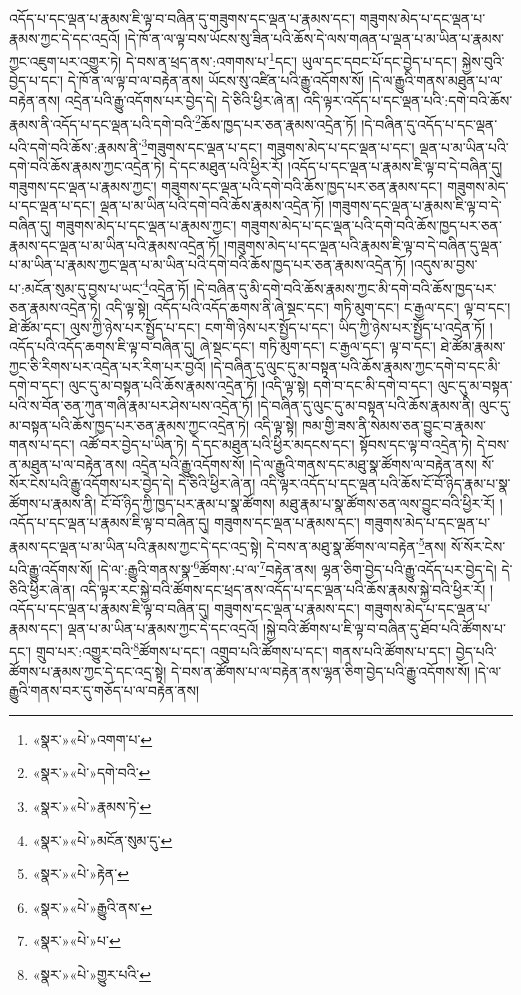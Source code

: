 འདོད་པ་དང་ལྡན་པ་རྣམས་ཇི་ལྟ་བ་བཞིན་དུ་གཟུགས་དང་ལྡན་པ་རྣམས་དང་། གཟུགས་མེད་པ་དང་ལྡན་པ་རྣམས་ཀྱང་དེ་དང་འདྲའོ། །དེ་ཁོ་ན་ལ་ལྟ་བས་ཡོངས་སུ་ཟིན་པའི་ཆོས་དེ་ལས་གཞན་པ་ལྡན་པ་མ་ཡིན་པ་རྣམས་ཀྱང་འཇུག་པར་འགྱུར་ཏེ། དེ་བས་ན་ཕྲད་ནས་:འགགས་པ་\footnote{«སྣར་»«པེ་»འགག་པ་}དང་། ཡུལ་དང་དབང་པོ་དང་བྱེད་པ་དང་། སྐྱེས་བུའི་བྱེད་པ་དང་། དེ་ཁོ་ན་ལ་ལྟ་བ་ལ་བརྟེན་ནས། ཡོངས་སུ་འཛིན་པའི་རྒྱུ་འདོགས་སོ། །དེ་ལ་རྒྱུའི་གནས་མཐུན་པ་ལ་བརྟེན་ནས། འདྲེན་པའི་རྒྱུ་འདོགས་པར་བྱེད་དེ། དེ་ཅིའི་ཕྱིར་ཞེ་ན། འདི་ལྟར་འདོད་པ་དང་ལྡན་པའི་:དགེ་བའི་ཆོས་རྣམས་ནི་འདོད་པ་དང་ལྡན་པའི་དགེ་བའི་\footnote{«སྣར་»«པེ་»དགེ་བའི་}ཆོས་ཁྱད་པར་ཅན་རྣམས་འདྲེན་ཏོ། །དེ་བཞིན་དུ་འདོད་པ་དང་ལྡན་པའི་དགེ་བའི་ཆོས་:རྣམས་ནི་\footnote{«སྣར་»«པེ་»རྣམས་ཏེ་}གཟུགས་དང་ལྡན་པ་དང་། གཟུགས་མེད་པ་དང་ལྡན་པ་དང་། ལྡན་པ་མ་ཡིན་པའི་དགེ་བའི་ཆོས་རྣམས་ཀྱང་འདྲེན་ཏེ། དེ་དང་མཐུན་པའི་ཕྱིར་རོ། །འདོད་པ་དང་ལྡན་པ་རྣམས་ཇི་ལྟ་བ་དེ་བཞིན་དུ། གཟུགས་དང་ལྡན་པ་རྣམས་ཀྱང་། གཟུགས་དང་ལྡན་པའི་དགེ་བའི་ཆོས་ཁྱད་པར་ཅན་རྣམས་དང་། གཟུགས་མེད་པ་དང་ལྡན་པ་དང་། ལྡན་པ་མ་ཡིན་པའི་དགེ་བའི་ཆོས་རྣམས་འདྲེན་ཏོ། །གཟུགས་དང་ལྡན་པ་རྣམས་ཇི་ལྟ་བ་དེ་བཞིན་དུ། གཟུགས་མེད་པ་དང་ལྡན་པ་རྣམས་ཀྱང་། གཟུགས་མེད་པ་དང་ལྡན་པའི་དགེ་བའི་ཆོས་ཁྱད་པར་ཅན་རྣམས་དང་ལྡན་པ་མ་ཡིན་པའི་རྣམས་འདྲེན་ཏོ། །གཟུགས་མེད་པ་དང་ལྡན་པའི་རྣམས་ཇི་ལྟ་བ་དེ་བཞིན་དུ་ལྡན་པ་མ་ཡིན་པ་རྣམས་ཀྱང་ལྡན་པ་མ་ཡིན་པའི་དགེ་བའི་ཆོས་ཁྱད་པར་ཅན་རྣམས་འདྲེན་ཏོ། །འདུས་མ་བྱས་པ་:མངོན་སུམ་དུ་བྱས་པ་ཡང་\footnote{«སྣར་»«པེ་»མངོན་སུམ་དུ་}འདྲེན་ཏོ། །དེ་བཞིན་དུ་མི་དགེ་བའི་ཆོས་རྣམས་ཀྱང་མི་དགེ་བའི་ཆོས་ཁྱད་པར་ཅན་རྣམས་འདྲེན་ཏེ། འདི་ལྟ་སྟེ། འདོད་པའི་འདོད་ཆགས་ནི་ཞེ་སྡང་དང་། གཏི་མུག་དང་། ང་རྒྱལ་དང་། ལྟ་བ་དང་། ཐེ་ཚོམ་དང་། ལུས་ཀྱི་ཉེས་པར་སྤྱོད་པ་དང་། ངག་གི་ཉེས་པར་སྤྱོད་པ་དང་། ཡིད་ཀྱི་ཉེས་པར་སྤྱོད་པ་འདྲེན་ཏོ། །འདོད་པའི་འདོད་ཆགས་ཇི་ལྟ་བ་བཞིན་དུ། ཞེ་སྡང་དང་། གཏི་མུག་དང་། ང་རྒྱལ་དང་། ལྟ་བ་དང་། ཐེ་ཚོམ་རྣམས་ཀྱང་ཅི་རིགས་པར་འདྲེན་པར་རིག་པར་བྱའོ། །དེ་བཞིན་དུ་ལུང་དུ་མ་བསྟན་པའི་ཆོས་རྣམས་ཀྱང་དགེ་བ་དང་མི་དགེ་བ་དང་། ལུང་དུ་མ་བསྟན་པའི་ཆོས་རྣམས་འདྲེན་ཏོ། །འདི་ལྟ་སྟེ། དགེ་བ་དང་མི་དགེ་བ་དང་། ལུང་དུ་མ་བསྟན་པའི་ས་བོན་ཅན་ཀུན་གཞི་རྣམ་པར་ཤེས་པས་འདྲེན་ཏོ། །དེ་བཞིན་དུ་ལུང་དུ་མ་བསྟན་པའི་ཆོས་རྣམས་ནི། ལུང་དུ་མ་བསྟན་པའི་ཆོས་ཁྱད་པར་ཅན་རྣམས་ཀྱང་འདྲེན་ཏེ། འདི་ལྟ་སྟེ། ཁམ་གྱི་ཟས་ནི་སེམས་ཅན་བྱུང་བ་རྣམས་གནས་པ་དང་། འཚོ་བར་བྱེད་པ་ཡིན་ཏེ། དེ་དང་མཐུན་པའི་ཕྱིར་མདངས་དང་། སྟོབས་དང་ལྟ་བ་འདྲེན་ཏེ། དེ་བས་ན་མཐུན་པ་ལ་བརྟེན་ནས། འདྲེན་པའི་རྒྱུ་འདོགས་སོ། །དེ་ལ་རྒྱུའི་གནས་དང་མཐུ་སྣ་ཚོགས་ལ་བརྟེན་ནས། སོ་སོར་ངེས་པའི་རྒྱུ་འདོགས་པར་བྱེད་དེ། དེ་ཅིའི་ཕྱིར་ཞེ་ན། འདི་ལྟར་འདོད་པ་དང་ལྡན་པའི་ཆོས་ངོ་བོ་ཉིད་རྣམ་པ་སྣ་ཚོགས་པ་རྣམས་ནི། ངོ་བོ་ཉིད་ཀྱི་ཁྱད་པར་རྣམ་པ་སྣ་ཚོགས། མཐུ་རྣམ་པ་སྣ་ཚོགས་ཅན་ལས་བྱུང་བའི་ཕྱིར་རོ། །འདོད་པ་དང་ལྡན་པ་རྣམས་ཇི་ལྟ་བ་བཞིན་དུ། གཟུགས་དང་ལྡན་པ་རྣམས་དང་། གཟུགས་མེད་པ་དང་ལྡན་པ་རྣམས་དང་ལྡན་པ་མ་ཡིན་པའི་རྣམས་ཀྱང་དེ་དང་འདྲ་སྟེ། དེ་བས་ན་མཐུ་སྣ་ཚོགས་ལ་བརྟེན་\footnote{«སྣར་»«པེ་»རྟེན་}ནས། སོ་སོར་ངེས་པའི་རྒྱུ་འདོགས་སོ། །དེ་ལ་:རྒྱུའི་གནས་སྣ་\footnote{«སྣར་»«པེ་»རྒྱུའི་ནས་}ཚོགས་:པ་ལ་\footnote{«སྣར་»«པེ་»པ་}བརྟེན་ནས། ལྷན་ཅིག་བྱེད་པའི་རྒྱུ་འདོད་པར་བྱེད་དེ། དེ་ཅིའི་ཕྱིར་ཞེ་ན། འདི་ལྟར་རང་སྐྱེ་བའི་ཚོགས་དང་ཕྲད་ནས་འདོད་པ་དང་ལྡན་པའི་ཆོས་རྣམས་སྐྱེ་བའི་ཕྱིར་རོ། །འདོད་པ་དང་ལྡན་པ་རྣམས་ཇི་ལྟ་བ་བཞིན་དུ། གཟུགས་དང་ལྡན་པ་རྣམས་དང་། གཟུགས་མེད་པ་དང་ལྡན་པ་རྣམས་དང་། ལྡན་པ་མ་ཡིན་པ་རྣམས་ཀྱང་དེ་དང་འདྲའོ། །སྐྱེ་བའི་ཚོགས་པ་ཇི་ལྟ་བ་བཞིན་དུ་ཐོབ་པའི་ཚོགས་པ་དང་། གྲུབ་པར་:འགྱུར་བའི་\footnote{«སྣར་»«པེ་»གྱུར་པའི་}ཚོགས་པ་དང་། འགྲུབ་པའི་ཚོགས་པ་དང་། གནས་པའི་ཚོགས་པ་དང་། བྱེད་པའི་ཚོགས་པ་རྣམས་ཀྱང་དེ་དང་འདྲ་སྟེ། དེ་བས་ན་ཚོགས་པ་ལ་བརྟེན་ནས་ལྷན་ཅིག་བྱེད་པའི་རྒྱུ་འདོགས་སོ། །དེ་ལ་རྒྱུའི་གནས་བར་དུ་གཅོད་པ་ལ་བརྟེན་ནས། 